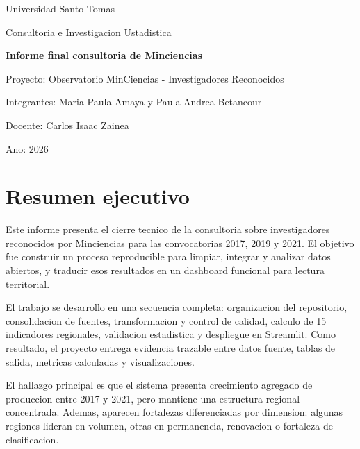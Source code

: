 \documentclass[12pt,letterpaper]{article}
\begin{document}
\begin{titlepage}
    \centering
    {\Large Universidad Santo Tomas\par}
    \vspace{0.4cm}
    {\large Consultoria e Investigacion Ustadistica\par}
    \vspace{1.7cm}
    {\LARGE \textbf{Informe final consultoria de Minciencias}\par}
    \vspace{1.0cm}
    {\large Proyecto: Observatorio MinCiencias - Investigadores Reconocidos\par}
    \vspace{0.9cm}
    {\large Integrantes: Maria Paula Amaya y Paula Andrea Betancour\par}
    \vspace{0.35cm}
    {\large Docente: Carlos Isaac Zainea\par}
    \vspace{0.35cm}
    {\large Ano: 2026\par}
    \vfill
\end{titlepage}

\tableofcontents
\newpage

\section{Resumen ejecutivo}

Este informe presenta el cierre tecnico de la consultoria sobre investigadores reconocidos por Minciencias para las convocatorias 2017, 2019 y 2021. El objetivo fue construir un proceso reproducible para limpiar, integrar y analizar datos abiertos, y traducir esos resultados en un dashboard funcional para lectura territorial.

El trabajo se desarrollo en una secuencia completa: organizacion del repositorio, consolidacion de fuentes, transformacion y control de calidad, calculo de 15 indicadores regionales, validacion estadistica y despliegue en Streamlit. Como resultado, el proyecto entrega evidencia trazable entre datos fuente, tablas de salida, metricas calculadas y visualizaciones.

El hallazgo principal es que el sistema presenta crecimiento agregado de produccion entre 2017 y 2021, pero mantiene una estructura regional concentrada. Ademas, aparecen fortalezas diferenciadas por dimension: algunas regiones lideran en volumen, otras en permanencia, renovacion o fortaleza de clasificacion.
\end{document}
